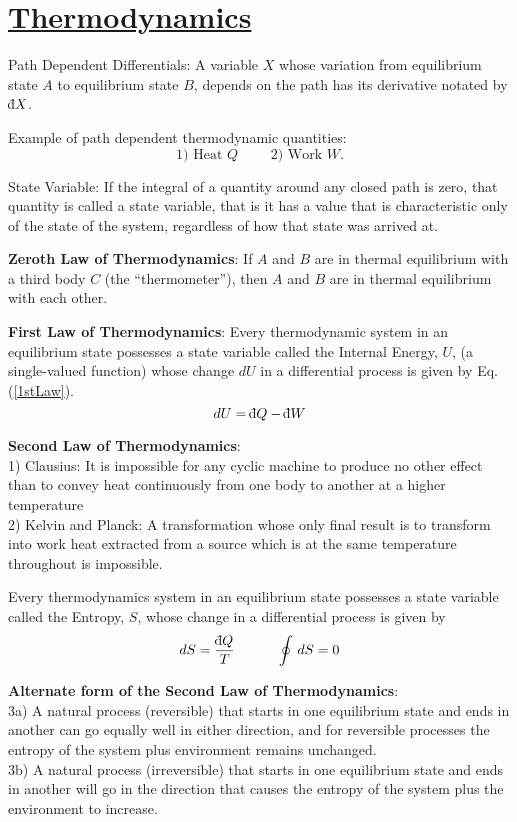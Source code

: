 \section{\underline{Thermodynamics}}

\begin{definition}Path Dependent Differentials: A variable $X$ whose variation from equilibrium state $A$ to equilibrium state $B$, depends on the path has its derivative notated by $\dbar X$. \end{definition}

Example of path dependent thermodynamic quantities: \[ \mbox{1) Heat } Q \quad \quad \mbox{ 2) Work } W. \] 

\begin{definition} State Variable: If the integral of a quantity around any closed path is zero, that quantity is called a state variable, that is it has a value that is characteristic only of the state of the system, regardless of how that state
was arrived at. \end{definition}

{\bf Zeroth Law of Thermodynamics}: If $A$ and $B$ are in thermal equilibrium with a third body $C$ (the ``thermometer''), then $A$ and $B$ are in thermal equilibrium with each other. 

{\bf First Law of Thermodynamics}: Every thermodynamic system in an equilibrium state possesses a state variable called the Internal Energy, $U$, (a single-valued function) whose change $dU$ in a differential process is given by
Eq. (\ref{1stLaw}). 
\[ dU = \dbar Q - \dbar W \label{1stLaw}\]

{\bf Second Law of Thermodynamics}:\\
1) Clausius: It is impossible for any cyclic machine to produce no other effect than to convey heat continuously from one body to another at a higher temperature \\
2) Kelvin and Planck: A transformation whose only final result is to transform into work heat extracted from a source which is at the same temperature throughout is impossible.
\begin{definition} Every thermodynamics system in an equilibrium state possesses a state variable called the Entropy, $S$, whose change in a differential process is given by
\[ dS = {\dbar Q\over T}\quad \quad\quad\oint \, dS = 0 \] \end{definition}


{\bf Alternate form of the Second Law of Thermodynamics}:\\
3a) A natural process (reversible) that starts in one equilibrium state and ends in another can go equally well in either direction, and for reversible processes the entropy of the system plus environment remains unchanged. \\
3b) A natural process (irreversible) that starts in one equilibrium state and ends in another will go in the direction that causes the entropy of the system plus the environment to increase. 

